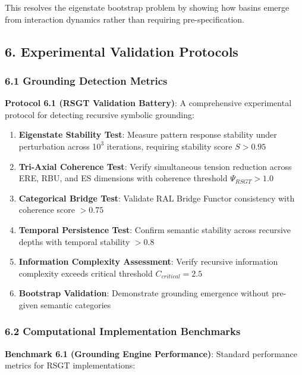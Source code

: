 \documentclass[
]{article}
\begin{document}
This resolves the eigenstate bootstrap problem by showing how basins
emerge from interaction dynamics rather than requiring
pre-specification.

\subsection{6. Experimental Validation
Protocols}\label{experimental-validation-protocols}

\subsubsection{6.1 Grounding Detection
Metrics}\label{grounding-detection-metrics}

\textbf{Protocol 6.1 (RSGT Validation Battery)}: A comprehensive
experimental protocol for detecting recursive symbolic grounding:

\begin{enumerate}
\def\labelenumi{\arabic{enumi}.}
\item
  \textbf{Eigenstate Stability Test}: Measure pattern response stability
  under perturbation across 1\(0^{3}\) iterations, requiring stability
  score \(S > 0.95\)
\item
  \textbf{Tri-Axial Coherence Test}: Verify simultaneous tension
  reduction across ERE, RBU, and ES dimensions with coherence threshold
  \(\Psi_{RSGT} > 1.0\)
\item
  \textbf{Categorical Bridge Test}: Validate RAL Bridge Functor
  consistency with coherence score \(> 0.75\)
\item
  \textbf{Temporal Persistence Test}: Confirm semantic stability across
  recursive depths with temporal stability \(> 0.8\)
\item
  \textbf{Information Complexity Assessment}: Verify recursive
  information complexity exceeds critical threshold
  \(C_{critical} = 2.5\)
\item
  \textbf{Bootstrap Validation}: Demonstrate grounding emergence without
  pre-given semantic categories
\end{enumerate}

\subsubsection{6.2 Computational Implementation
Benchmarks}\label{computational-implementation-benchmarks}

\textbf{Benchmark 6.1 (Grounding Engine Performance)}: Standard
performance metrics for RSGT implementations:
\end{document}
